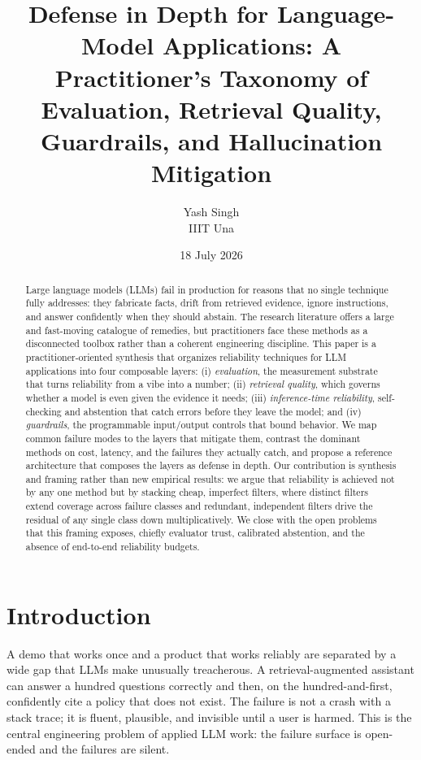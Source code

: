 \documentclass[11pt]{article}
\title{Defense in Depth for Language-Model Applications:
A Practitioner's Taxonomy of Evaluation, Retrieval Quality, Guardrails,
and Hallucination Mitigation}
\author{Yash Singh\\
\small IIIT Una}
\date{18 July 2026}
\begin{document}
\vspace*{-2em}
\maketitle

\begin{abstract}
Large language models (LLMs) fail in production for reasons that no single
technique fully addresses: they fabricate facts, drift from retrieved evidence,
ignore instructions, and answer confidently when they should abstain. The
research literature offers a large and fast-moving catalogue of remedies, but
practitioners face these methods as a disconnected toolbox rather than a
coherent engineering discipline. This paper is a practitioner-oriented synthesis
that organizes reliability techniques for LLM applications into four composable
layers: (i) \emph{evaluation}, the measurement substrate that turns
reliability from a vibe into a number; (ii) \emph{retrieval quality}, which
governs whether a model is even given the evidence it needs; (iii)
\emph{inference-time reliability}, self-checking and abstention that catch
errors before they leave the model; and (iv) \emph{guardrails}, the
programmable input/output controls that bound behavior. We map common failure
modes to the layers that mitigate them, contrast the dominant methods on cost,
latency, and the failures they actually catch, and propose a reference
architecture that composes the layers as defense in depth. Our contribution is
synthesis and framing rather than new empirical results: we argue that
reliability is achieved not by any one method but by stacking cheap, imperfect
filters, where distinct filters extend coverage across failure classes and
redundant, independent filters drive the residual of any single class down
multiplicatively. We close with the open
problems that this framing exposes, chiefly evaluator trust, calibrated
abstention, and the absence of end-to-end reliability budgets.
\end{abstract}

\section{Introduction}

A demo that works once and a product that works reliably are separated by a wide
gap that LLMs make unusually treacherous. A retrieval-augmented assistant can
answer a hundred questions correctly and then, on the hundred-and-first,
confidently cite a policy that does not exist. The failure is not a crash with a
stack trace; it is fluent, plausible, and invisible until a user is harmed. This
is the central engineering problem of applied LLM work: the failure surface is
open-ended and the failures are silent.
\end{document}
